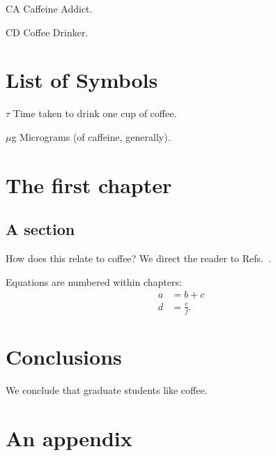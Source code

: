 \documentclass{uiucthesis2021}
\newcounter{counterforappendices}
\begin{document}
\begin{abbrevlist}
\item[CA] Caffeine Addict.
\item[CD] Coffee Drinker.
\end{abbrevlist}

\chapter{List of Symbols}

\begin{symbollist}[0.7in]
\item[$\tau$] Time taken to drink one cup of coffee.
\item[$\mu$g] Micrograms (of caffeine, generally).
\end{symbollist}

\mainmatter

\chapter{The first chapter}

\section{A section}

\lipsum[1-5]

How does this relate to coffee? We direct the reader to Refs.~\cite{Trembly98,Childish07,Presso10}.

Equations are numbered within chapters:
\begin{align}
    a
    &= b + c \\
    d
    &= \frac{e}{f}.
\end{align}

% 
% 
% 
% 

\chapter{Conclusions}

We conclude that graduate students like coffee.


\backmatter

\printbibliography[heading=bibintoc,title={References}]

\clearpage
\setcounter{counterforappendices}{\value{page}}
\mainmatter
\setcounter{page}{\value{counterforappendices}}

\appendix

\chapter{An appendix}

\lipsum[1-5]

% 
\end{document}
